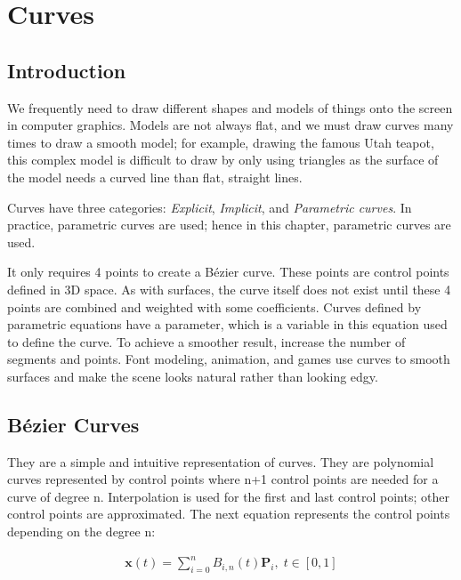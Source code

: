 \documentclass{article}
\begin{document}
	
	
	\section{Curves}
	\subsection{Introduction}
	We frequently need to draw different shapes and models of things onto the screen in computer graphics. Models are not always flat, and we must draw curves many times to draw a smooth model; for example, drawing the famous Utah teapot, this complex model is difficult to draw by only using triangles as the surface of the model needs a curved line than flat, straight lines. 
	
	\vspace*{5px}
	Curves have three categories: \textit{Explicit}, \textit{Implicit}, and \textit{Parametric curves}. In practice, parametric curves are used; hence in this chapter, parametric curves are used.
	
	It only requires 4 points to create a Bézier curve. These points are control points defined in 3D space. As with surfaces, the curve itself does not exist until these 4 points are combined and weighted with some coefficients. Curves defined by parametric equations have a parameter, which is a variable in this equation used to define the curve. To achieve a smoother result, increase the number of segments and points.
	Font modeling, animation, and games use curves to smooth surfaces and make the scene looks natural rather than looking edgy. 
	
	\subsection{Bézier Curves}
	They are a simple and intuitive representation of curves. They are polynomial curves represented by control points where n+1 control points are needed for a curve of degree n.
	Interpolation is used for the first and last control points; other control points are approximated. The next equation represents the control points depending on the degree n: 
	
	\begin{equation}
		\begin{split}
			\pmb{x}(t)=\sum_{i = 0}^{n} B_{i,n}(t) \pmb{P}_i, \; t \in [0,1]
		\end{split}		
	\end{equation}
	
\end{document}
